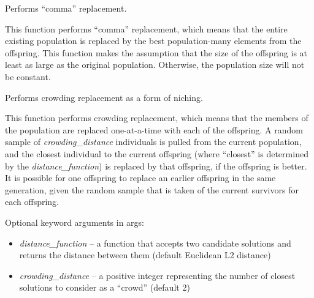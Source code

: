 \documentclass[letterpaper,10pt,english]{sphinxmanual}
\begin{document}
\begin{fulllineitems}
\label{reference:inspyred.ec.replacers.comma_replacement}
Performs ``comma'' replacement.

This function performs ``comma'' replacement, which means that
the entire existing population is replaced by the best
population-many elements from the offspring. This function
makes the assumption that the size of the offspring is at 
least as large as the original population. Otherwise, the
population size will not be constant.

\end{fulllineitems}


\begin{fulllineitems}
\label{reference:inspyred.ec.replacers.crowding_replacement}
Performs crowding replacement as a form of niching.

This function performs crowding replacement, which means that
the members of the population are replaced one-at-a-time with
each of the offspring. A random sample of \emph{crowding\_distance}
individuals is pulled from the current population, and the
closest individual to the current offspring (where ``closest''
is determined by the \emph{distance\_function}) is replaced by that
offspring, if the offspring is better. It is possible for one 
offspring to replace an earlier offspring in the same generation, 
given the random sample that is taken of the current survivors 
for each offspring.

Optional keyword arguments in args:
\begin{itemize}
\item {} 
\emph{distance\_function} -- a function that accepts two candidate 
solutions and returns the distance between them (default 
Euclidean L2 distance)

\item {} 
\emph{crowding\_distance} -- a positive integer representing the 
number of closest solutions to consider as a ``crowd'' (default 2)

\end{itemize}

\end{fulllineitems}
\end{document}
